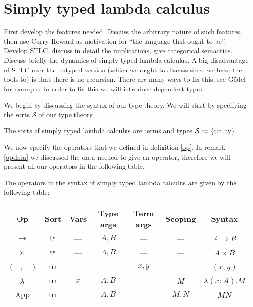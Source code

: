 %
%
\section{Simply typed lambda calculus} 


First develop the features needed. Discuss the arbitrary nature of such features, then use Curry-Howard as motivation for ``the language that ought to be''. Develop STLC, discuss in detail the implications, give categorical semantics. Discuss briefly the dynamics of simply typed lambda calculus. A big disadvantage of STLC over the untyped version (which we ought to discuss since we have the tools to) is that there is no recursion. There are many ways to fix this, see G\"odel for example. In order to fix this we will introduce dependent types.

We begin by discussing the syntax of our type theory. We will start by specifying the sorts $\mathcal{S}$ of our type theory.

\begin{defin}
    The sorts of simply typed lambda calculus are terms and types $\mathcal{S} := \{ \mathrm{tm} , \mathrm{ty}\}$.
\end{defin}

We now specify the operators that we defined in definition \ref{op}. In remark \ref{opdata} we discussed the data needed to give an operator, therefore we will present all our operators in the following table.

\begin{defin}
    The operators in the syntax of simply typed lambda calculus are given by the following table:
    \begin{center}
        \begin{tabular}{ c|c|c|c|c|c|c }
        Op & Sort & Vars & Type args & Term args & Scoping & Syntax \\
        \hline
        $\to$           & $\mathrm{ty}$ &  --- & $A,B$ &  ---  &  ---  & $A \to B$            \\
        $\times$        & $\mathrm{ty}$ &  --- & $A,B$ &  ---  &  ---  & $A \times B$         \\
        $(-,-)$         & $\mathrm{tm}$ &  --- &  ---  & $x,y$ &  ---  & $(x,y)$              \\
        $\lambda$       & $\mathrm{tm}$ &  $x$ & $A,B$ &  ---  &  $M$  & $\lambda (x : A).M$  \\
        $\mathrm{App}$  & $\mathrm{tm}$ &  --- & $A,B$ &  ---  & $M,N$ & $M N$
        \end{tabular}
    \end{center}
\end{defin}

